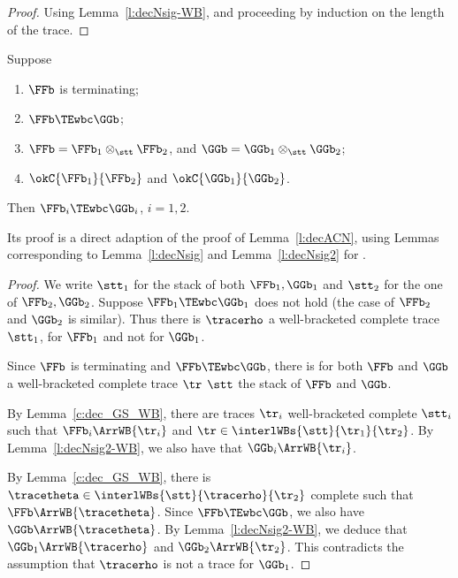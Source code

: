 \begin{proof}
Using Lemma~\ref{l:decNsig-WB}, and proceeding by induction on the length of the trace.  
\end{proof} 
\fi

\begin{lemma}
\label{l:decWBCN}
  Suppose 
  \begin{enumerate}
    \item $\FFb$ is terminating;
    \item $\FFb  \TEwbc \GGb$; 
    \item $\FFb = \FFb_1 \otimes_{\stt} \FFb_2$,   
    and  
    $\GGb = \GGb_1 \otimes_{\stt} \GGb_2$;
    \item $\okC{\FFb_1}{\FFb_2}$ and $\okC{\GGb_1}{\GGb_2}$.
  \end{enumerate} 
  Then
  $\FFb_i  \TEwbc \GGb_i$, $i=1,2$. 
\end{lemma}   
\noindent
Its proof is a direct adaption of the proof of Lemma~\ref{l:decACN},
using Lemmas corresponding to Lemma~\ref{l:decNsig} and Lemma~\ref{l:decNsig2}
for \WBOGS.


\ifcutLMCS

\begin{proof}
  We write $\stt_1$ for the stack of both $\FFb_1, \GGb_1$
  and $\stt_2$ for the one of $\FFb_2, \GGb_2$.
  Suppose $\FFb_1  \TEwbc \GGb_1$ 
  does not hold (the  case of $\FFb_2$ and $\GGb_2$  is similar).
  Thus there is $\tracerho$ a well-bracketed complete trace \wrt $\stt_1$, for $\FFb_1$ and not for $\GGb_1$. 
  
  Since $\FFb$ is terminating
  and $\FFb  \TEwbc \GGb$, 
  there is for both $\FFb$ and $\GGb$ 
  a well-bracketed complete trace
  $\tr$ \wrt $\stt$
  the stack of $\FFb$ and $\GGb$.
  
  By Lemma~\ref{c:dec_GS_WB}, there are traces $\tr_i$
  well-bracketed complete \wrt $\stt_i$ such that 
  $\FFb_i \ArrWB {\tr_i}$ 
  and $\tr \in \interlWBs{\stt}{ \tr_1}{\tr_2}$.
  By Lemma~\ref{l:decNsig2-WB}, we also have that
  $\GGb_i \ArrWB {\tr_i}$.   
  
  By Lemma~\ref{c:dec_GS_WB}, there is 
   $\tracetheta \in \interlWBs{\stt}{\tracerho}{\tr_2}$ complete such that
  $\FFb \ArrWB {\tracetheta } $.
  Since 
  $\FFb  \TEwbc \GGb$, 
  we also have $\GGb \ArrWB {\tracetheta } $. 
  By Lemma~\ref{l:decNsig2-WB}, 
  we deduce that 
  $\GGb_1 \ArrWB {\tracerho }$ and 
  $\GGb_2 \ArrWB {\tr_2 }$.
  This contradicts the assumption that 
   ${\tracerho }$ is not a trace for $\GGb_1$.
\end{proof} 
\fi